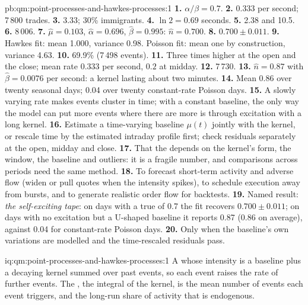\begin{solution}{pb:qm:point-processes-and-hawkes-processes:1}
\textbf{1.} $\alpha/\beta = 0.7$.
\textbf{2.} $0.333$ per second; 7\,800 trades.
\textbf{3.} $3.33$; 30\% immigrants.
\textbf{4.} $\ln 2 = 0.69$ seconds.
\textbf{5.} 2.38 and 10.5.
\textbf{6.} 8\,006.
\textbf{7.} $\hat\mu = 0.103$, $\hat\alpha = 0.696$, $\hat\beta = 0.995$: $\hat n = 0.700$.
\textbf{8.} $0.700 \pm 0.011$.
\textbf{9.} Hawkes fit: mean 1.000, variance 0.98. Poisson fit: mean one by construction, variance 4.63.
\textbf{10.} 69.9\% (7\,498 events).
\textbf{11.} Three times higher at the open and the close; mean rate $0.333$ per second, $0.2$ at midday.
\textbf{12.} 7\,730.
\textbf{13.} $\hat n = 0.87$ with $\hat\beta = 0.0076$ per second: a kernel lasting about two minutes.
\textbf{14.} Mean 0.86 over twenty seasonal days; 0.04 over twenty constant-rate Poisson days.
\textbf{15.} A slowly varying rate makes events cluster in time; with a constant baseline, the only way the model
can put more events where there are more is through excitation with a long kernel.
\textbf{16.} Estimate a time-varying baseline $\mu(t)$ jointly with the kernel, or rescale time by the estimated
intraday profile first; check residuals separately at the open, midday and close.
\textbf{17.} That the  depends on the kernel's form, the window, the baseline and outliers:
it is a fragile number, and comparisons across periods need the same method.
\textbf{18.} To forecast short-term activity and adverse flow (widen or pull quotes when the intensity spikes),
to schedule execution away from bursts, and to generate realistic order flow for backtests.
\textbf{19.} Named result: \emph{the self-exciting tape}: on days with a true  of 0.7 the fit
recovers $0.700 \pm 0.011$; on days with no excitation but a U-shaped baseline it reports 0.87 (0.86 on average),
against 0.04 for constant-rate Poisson days.
\textbf{20.} Only when the baseline's own variations are modelled and the time-rescaled residuals pass.
\end{solution}

\begin{solution}{iq:qm:point-processes-and-hawkes-processes:1}
A  whose intensity is a baseline plus a decaying kernel summed over past events, so each event
raises the rate of further events. The , the integral of the kernel, is the mean number of events
each event triggers, and the long-run share of activity that is endogenous.
\end{solution}

